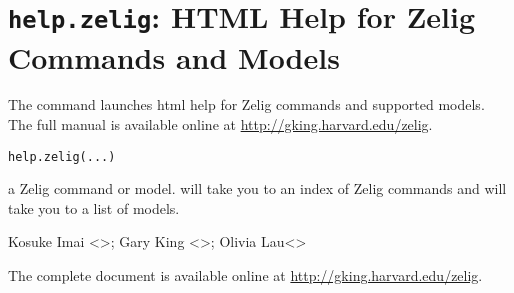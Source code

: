 \section{{\tt help.zelig}: HTML Help for Zelig Commands and Models}\label{ss:help.zelig}
\begin{Description}\relax
The  command launches html help for Zelig commands
and supported models.  The full manual is available online at
\url{http://gking.harvard.edu/zelig}.
\end{Description}
\begin{Usage}
\begin{verbatim}
help.zelig(...)
\end{verbatim}
\end{Usage}
\begin{Arguments}
\begin{ldescription}
\item[\code{...}] a Zelig command or model. 
 will take you to an index of Zelig
commands and  will take you to a list of
models. 
\end{ldescription}
\end{Arguments}
\begin{Author}\relax
Kosuke Imai <>; Gary King
<>; Olivia Lau<>
\end{Author}
\begin{SeeAlso}\relax
The complete document is available online at
\url{http://gking.harvard.edu/zelig}.
\end{SeeAlso}


